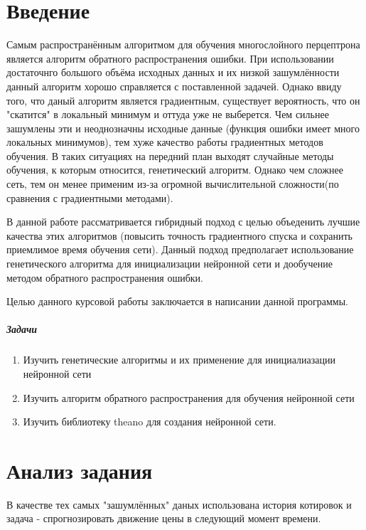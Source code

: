 \documentclass[a4paper,12pt]{article}
\begin{document}
\newpage\section*{Введение}
Самым распространённым алгоритмом для обучения многослойного перцептрона является алгоритм обратного распространения ошибки. При использовании достаточнго большого объёма исходных данных и их низкой зашумлённости данный алгоритм хорошо справляется с поставленной задачей. Однако ввиду того, что даный алгоритм является градиентным, существует вероятность, что он "скатится" в локальный минимум и оттуда уже не выберется. Чем сильнее зашумлены эти и неоднозначны исходные данные (функция ошибки имеет много локальных минимумов), тем хуже качество работы градиентных методов обучения. В таких ситуациях на передний план выходят случайные методы обучения, к которым относится, генетический алгоритм. Однако чем сложнее сеть, тем он менее применим из-за огромной вычислительной сложности(по сравнения с градиентными методами). 
\par В данной работе рассматривается гибридный подход с целью объеденить лучшие качества этих алгоритмов (повысить точность градиентного спуска и сохранить приемлимое время обучения сети). Данный подход предполагает использование генетического алгоритма для инициализации нейронной сети и дообучение методом обратного распространения ошибки.
\par 

\par Целью данного курсовой работы заключается в написании данной программы.
\subparagraph{Задачи}
\begin{enumerate}
\item Изучить генетические алгоритмы и их применение для инициалиазации нейронной сети
\item Изучить алгоритм обратного распространения для обучения нейронной сети
\item Изучить библиотеку theano для создания нейронной сети.
\end{enumerate}

\newpage\section{Анализ задания}

\par В качестве тех самых "зашумлённых" даных использована история котировок и задача - спрогнозировать движение цены в следующий момент времени.
\end{document}
